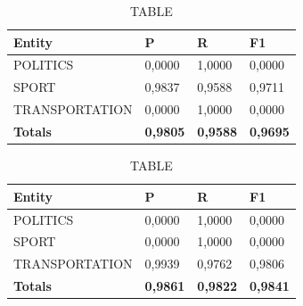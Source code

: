 \documentclass[thesis=M,english]{FITthesis}[2018/05/30]
\begin{document}
	\begin{table}[H]\centering
		\caption{TABLE}
		\label{}
		\begin{tabular}{|l|l|l|l|}
			\hline {\textbf{Entity}} & {\textbf{P}} & {\textbf{R}} & {\textbf{F1}}\\\hline
				POLITICS & 0,0000 & 1,0000 & 0,0000\\
				SPORT & 0,9837 & 0,9588 & 0,9711\\
				TRANSPORTATION & 0,0000 & 1,0000 & 0,0000\\\hline
				\textbf{Totals} & \textbf{0,9805} & \textbf{0,9588} & \textbf{0,9695}\\\hline
		\end{tabular}
	\end{table}	

	\begin{table}[H]\centering
		\caption{TABLE}
		\label{}
		\begin{tabular}{|l|l|l|l|}
			\hline {\textbf{Entity}} & {\textbf{P}} & {\textbf{R}} & {\textbf{F1}}\\\hline
				POLITICS & 0,0000 & 1,0000 & 0,0000\\
				SPORT & 0,0000 & 1,0000 & 0,0000\\
				TRANSPORTATION & 0,9939 & 0,9762 & 0,9806\\\hline
				\textbf{Totals} & \textbf{0,9861} & \textbf{0,9822} & \textbf{0,9841}\\\hline
		\end{tabular}
	\end{table}	
		

\end{document}
